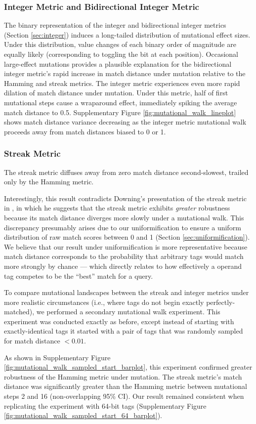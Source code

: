 \subsubsection{Integer Metric and Bidirectional Integer Metric}
\label{sec:mutation_integer}

The binary representation of the integer and bidirectional integer metrics (Section \ref{sec:integer}) induces a long-tailed distribution of mutational effect sizes.
Under this distribution, value changes of each binary order of magnitude are equally likely (corresponding to toggling the bit at each position).
Occasional large-effect mutations provides a plausible explanation for the bidirectional integer metric's rapid increase in match distance under mutation relative to the Hamming and streak metrics.
The integer metric experiences even more rapid dilation of match distance under mutation.
Under this metric, half of first mutational steps cause a wraparound effect, immediately spiking the average match distance to 0.5.
Supplementary Figure \ref{fig:mutational_walk_lineplot} shows match distance variance decreasing as the integer metric mutational walk proceeds away from match distances biased to 0 or 1.

\subsubsection{Streak Metric}

The streak metric diffuses away from zero match distance second-slowest, trailed only by the Hamming metric.

Interestingly, this result contradicts Downing's presentation of the streak metric in \citep{downing2015intelligence}, in which he suggests that the streak metric exhibits \textit{greater} robustness because its match distance diverges more slowly under a mutational walk.
This discrepancy presumably arises due to our uniformification to ensure a uniform distribution of raw match scores between 0 and 1 (Section \ref{sec:uniformification}).
We believe that our result under uniformification is more representative because match distance corresponds to the probability that arbitrary tags would match more strongly by chance --- which directly relates to how effectively a operand tag competes to be the ``best'' match for a query.

To compare mutational landscapes between the streak and integer metrics under more realistic circumstances (i.e., where tags do not begin exactly perfectly-matched), we performed a secondary mutational walk experiment.
This experiment was conducted exactly as before, except instead of starting with exactly-identical tags it started with a pair of tags that was randomly sampled for match distance $<0.01$.

As shown in Supplementary Figure \ref{fig:mutational_walk_sampled_start_barplot}, this experiment confirmed greater robustness of the Hamming metric under mutation.
The streak metric's match distance was significantly greater than the Hamming metric between mutational steps 2 and 16 (non-overlapping 95\% CI).
Our result remained consistent when replicating the experiment with 64-bit tags (Supplementary Figure \ref{fig:mutational_walk_sampled_start_64_barplot}).

